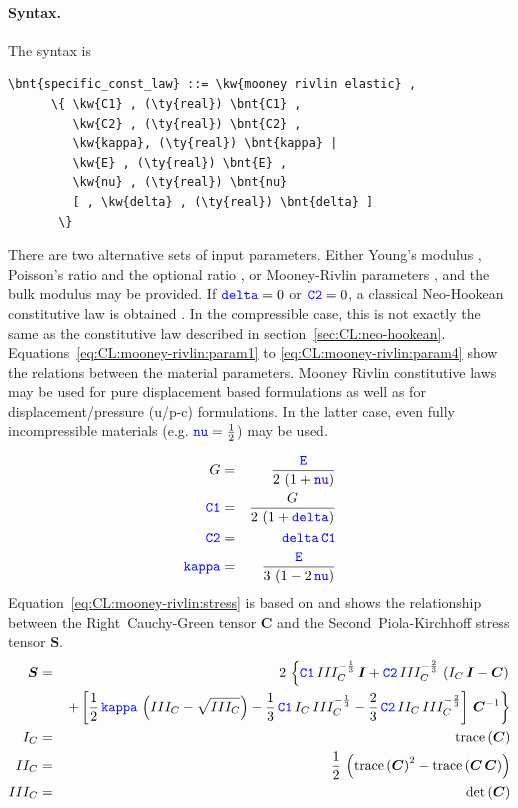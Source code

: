 \paragraph{Syntax.}
The syntax is
\begin{Verbatim}[commandchars=\\\{\}]
    \bnt{specific_const_law} ::= \kw{mooney rivlin elastic} ,
      \{ \kw{C1} , (\ty{real}) \bnt{C1} ,
         \kw{C2} , (\ty{real}) \bnt{C2} ,
         \kw{kappa}, (\ty{real}) \bnt{kappa} |
         \kw{E} , (\ty{real}) \bnt{E} ,
         \kw{nu} , (\ty{real}) \bnt{nu}
         [ , \kw{delta} , (\ty{real}) \bnt{delta} ]
       \}
\end{Verbatim}
There are two alternative sets of input parameters.
Either Young's modulus , Poisson's ratio  and the optional ratio ,
or Mooney-Rivlin parameters ,  and the bulk modulus  may be provided.
If $\textcolor{blue}{\texttt{delta}}=0$ or $\textcolor{blue}{\texttt{C2}}=0$, a classical Neo-Hookean constitutive law is obtained \cite{BATHE2016}.
In the compressible case, this is not exactly the same as the constitutive law described
in section~\ref{sec:CL:neo-hookean}.
Equations~\ref{eq:CL:mooney-rivlin:param1} to \ref{eq:CL:mooney-rivlin:param4} show the relations between the material parameters.
Mooney Rivlin constitutive laws may be used for pure displacement based formulations
as well as for displacement/pressure (u/p-c) formulations.
In the latter case, even fully incompressible materials (e.g. $\textcolor{blue}{\texttt{nu}} = \frac{1}{2}$) may be used.

\begin{eqnarray}
  G & = & \frac{\textcolor{blue}{\texttt{E}}}{2\,\left(1 + \textcolor{blue}{\texttt{nu}}\right)} \label{eq:CL:mooney-rivlin:param1} \\
  \textcolor{blue}{\texttt{C1}} & = & \frac{G}{2\,\left(1 + \textcolor{blue}{\texttt{delta}}\right)} \\
  \textcolor{blue}{\texttt{C2}} & = & \textcolor{blue}{\texttt{delta}}\,\textcolor{blue}{\texttt{C1}} \\
  \textcolor{blue}{\texttt{kappa}} & = & \frac{\textcolor{blue}{\texttt{E}}}{3\,\left(1 - 2\,\textcolor{blue}{\texttt{nu}}\right)}
  \label{eq:CL:mooney-rivlin:param4}
\end{eqnarray}
Equation~\ref{eq:CL:mooney-rivlin:stress} is based on \cite{BATHE2016} and shows the relationship
between the Right~Cauchy-Green tensor $\boldsymbol{C}$ and the Second~Piola-Kirchhoff stress tensor $\boldsymbol{S}$.
\begin{eqnarray}
  \boldsymbol{S} & = & 2\,\left\{ \textcolor{blue}{\texttt{C1}} \, III_C^{-\frac{1}{3}} \, \boldsymbol{I} + \textcolor{blue}{\texttt{C2}} \, III_C^{-\frac{2}{3}} \, \left(I_C \, \boldsymbol{I} - \boldsymbol{C} \right)\right. \nonumber \\
  & &  \left.+\left[ \frac{1}{2} \, \textcolor{blue}{\texttt{kappa}} \,\left(III_C - \sqrt{III_C}\right) - \frac{1}{3} \, \textcolor{blue}{\texttt{C1}} \, I_C \, III_C^{-\frac{1}{3}} - \frac{2}{3} \, \textcolor{blue}{\texttt{C2}} \, II_C \, III_C^{-\frac{2}{3}} \right]\, \boldsymbol{C}^{-1}\right\}
    \label{eq:CL:mooney-rivlin:stress} \\
  I_C & = & \operatorname{trace}\left(\boldsymbol{C}\right) \\
  II_C & = & \frac{1}{2} \,\left(\operatorname{trace}\left(\boldsymbol{C}\right)^2 - \operatorname{trace}\left(\boldsymbol{C} \, \boldsymbol{C}\right)\right) \\
  III_C & = & \det\left(\boldsymbol{C}\right)
\end{eqnarray}

